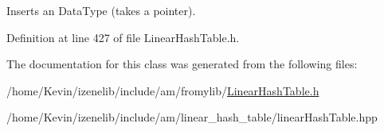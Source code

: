 Inserts an DataType (takes a pointer). 

Definition at line 427 of file LinearHashTable.h.

The documentation for this class was generated from the following files:\begin{CompactItemize}
\item 
/home/Kevin/izenelib/include/am/fromylib/\hyperlink{LinearHashTable_8h}{LinearHashTable.h}\item 
/home/Kevin/izenelib/include/am/linear\_\-hash\_\-table/linearHashTable.hpp\end{CompactItemize}
